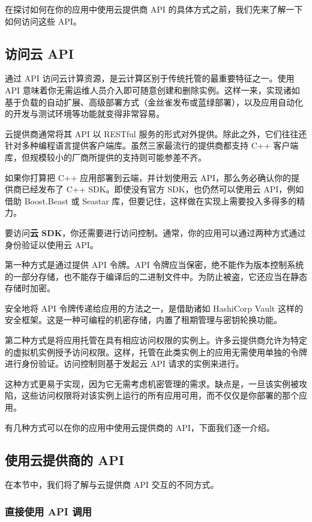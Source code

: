 在探讨如何在你的应用中使用云提供商 API 的具体方式之前，我们先来了解一下如何访问这些 API。

\subsection{访问云 API}

\label{idx:1460}
通过 API 访问云计算资源，是云计算区别于传统托管的最重要特征之一。使用 API 意味着你无需运维人员介入即可随意创建和删除实例。这样一来，实现诸如基于负载的自动扩展、高级部署方式（金丝雀发布或蓝绿部署），以及应用自动化的开发与测试环境等功能就变得非常容易。

云提供商通常将其 API 以 RESTful 服务的形式对外提供。除此之外，它们往往还针对多种编程语言提供客户端库。虽然三家最流行的提供商都支持 C++ 客户端库，但规模较小的厂商所提供的支持则可能参差不齐。

如果你打算把 C++ 应用部署到云端，并计划使用云 API，那么务必确认你的提供商已经发布了 C++ SDK。即使没有官方 SDK，也仍然可以使用云 API，例如借助 Boost.Beast 或 Seastar 库，但要记住，这样做在实现上需要投入多得多的精力。

\label{idx:1461}
要访问\textbf{云 SDK}，你还需要进行访问控制。通常，你的应用可以通过两种方式通过身份验证以使用云 API。

第一种方式是通过提供 API 令牌。API 令牌应当保密，绝不能作为版本控制系统的一部分存储，也不能存于编译后的二进制文件中。为防止被盗，它还应当在静态存储时加密。

安全地将 API 令牌传递给应用的方法之一，是借助诸如 HashiCorp Vault 这样的安全框架。这是一种可编程的机密存储，内置了租期管理与密钥轮换功能。

第二种方式是将应用托管在具有相应访问权限的实例上。许多云提供商允许为特定的虚拟机实例授予访问权限。这样，托管在此类实例上的应用无需使用单独的令牌进行身份验证。访问控制则基于发起云 API 请求的实例来进行。

这种方式更易于实现，因为它无需考虑机密管理的需求。缺点是，一旦该实例被攻陷，这些访问权限将对该实例上运行的所有应用可用，而不仅仅是你部署的那个应用。

\label{idx:1462}
有几种方式可以在你的应用中使用云提供商的 API，下面我们逐一介绍。

\subsection{使用云提供商的 API}

\label{idx:1463}
在本节中，我们将了解与云提供商 API 交互的不同方式。

\subsubsection{直接使用 API 调用}

